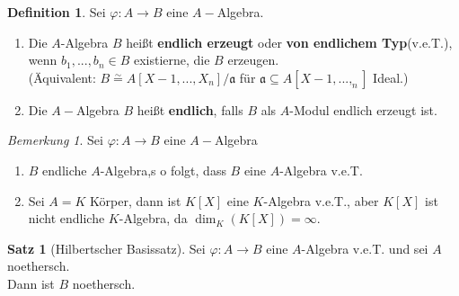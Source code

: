 \documentclass[10pt,a4paper]{article}
\newcommand{\isomorph}{\ensuremath{\overset{\sim}{=}}}
\newcounter{thm}[section]
\theoremstyle{definition}
\newtheorem{definition}[thm]{Definition}
\newtheorem{satz}[thm]{Satz}
\theoremstyle{plain}
\theoremstyle{remark}
\newtheorem{bem}[thm]{Bemerkung}
\begin{document}
\begin{definition}
	Sei $\varphi: A\rightarrow B$ eine $A-$Algebra.\\
	\begin{enumerate}
		\item Die $A$-Algebra $B$ heißt \textbf{endlich erzeugt} oder \textbf{von endlichem Typ}(v.e.T.), wenn $b_1,...,b_n\in B$ existierne, die $B$ erzeugen.\\
		(Äquivalent: $B\isomorph A[X-1,...,X_n]/\mathfrak a$ für $\mathfrak a\subseteq A[X-1,...,_n]$ Ideal.)
		
		\item Die $A-$Algebra $B$ heißt \textbf{endlich}, falls $B$ als $A$-Modul endlich erzeugt ist.
	\end{enumerate}
\end{definition}
\begin{bem}
	Sei $\varphi:A\rightarrow B$ eine $A-$Algebra\begin{enumerate}
		\item $B$ endliche $A$-Algebra,s o folgt, dass $B$ eine $A$-Algebra v.e.T.
		\item Sei $A=K$ Körper, dann ist $K[X]$ eine $K$-Algebra v.e.T., aber $K[X]$ ist nicht endliche $K$-Algebra, da $\dim_K(K[X])=\infty$.
	\end{enumerate}
\end{bem}
\begin{satz}[Hilbertscher Basissatz]
	Sei $\varphi:A\rightarrow B$ eine $A$-Algebra v.e.T. und sei $A$ noethersch.\\
	Dann ist $B$ noethersch.
\end{satz}
\end{document}
